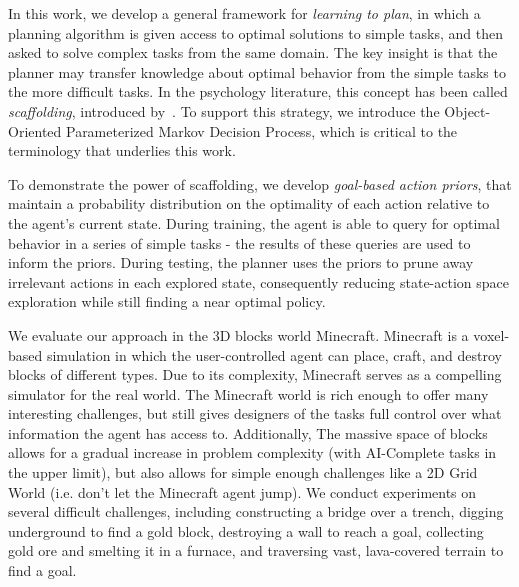 \documentclass[11pt]{article}
\begin{document}
In this work, we develop a general framework for {\it learning to plan}, in which a planning algorithm is given access to optimal solutions to simple tasks, and then asked to solve complex tasks from the same domain. The key insight is that the planner may transfer knowledge about optimal behavior from the simple tasks to the more difficult tasks. In the psychology literature, this concept has been called {\it scaffolding}, introduced by~\cite{wood1976role}. To support this strategy, we introduce the Object-Oriented Parameterized Markov Decision Process, which is critical to the terminology that underlies this work.

To demonstrate the power of scaffolding, we develop {\it goal-based action priors}, that maintain a probability distribution on the optimality of each action relative to the agent's current state. During training, the agent is able to query for optimal behavior in a series of simple tasks - the results of these queries are used to inform the priors. During testing, the planner uses the priors to prune away irrelevant actions in each explored state, consequently reducing state-action space exploration while still finding a near optimal policy.

We evaluate our approach in the 3D blocks world Minecraft. Minecraft is a voxel-based simulation in which the user-controlled agent can place, craft, and destroy blocks of different types. Due to its complexity, Minecraft serves as a compelling simulator for the real world. The Minecraft world is rich enough to offer many interesting challenges, but still gives designers of the tasks full control over what information the agent has access to. Additionally, The massive space of blocks allows for a gradual increase in problem complexity (with AI-Complete tasks in the upper limit), but also allows for simple enough challenges like a 2D Grid World (i.e. don't let the Minecraft agent jump). We conduct experiments on several difficult challenges, including constructing a bridge over a trench, digging underground to find a gold block, destroying a wall to reach a goal, collecting gold ore and smelting it in a furnace, and traversing vast, lava-covered terrain to find a goal.

\end{document}
